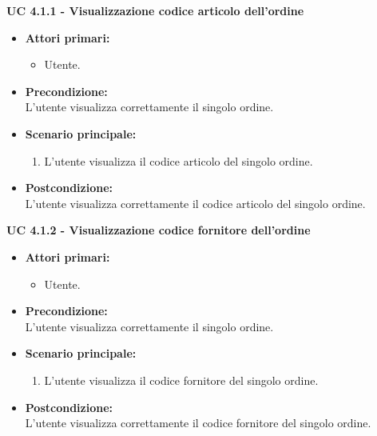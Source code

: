 \vspace{0.4cm}

\noindent \textbf{\large UC 4.1.1 - Visualizzazione codice articolo dell'ordine}
\label{uc:visualizzazione-codice-articolo}
\begin{itemize}

	\item \textbf{Attori primari: }
		\begin{itemize}
			\item Utente.
		\end{itemize}

	\item \textbf{Precondizione: }\\[0.3cm]
		L'utente visualizza correttamente il singolo ordine.

	\item \textbf{Scenario principale: }
		\begin{enumerate}
			\item L'utente visualizza il codice articolo del singolo ordine.
		\end{enumerate}
		

	\item \textbf{Postcondizione: }\\[0.3cm]
		L'utente visualizza correttamente il codice articolo del singolo ordine.

\end{itemize}

\vspace{0.4cm}

\noindent \textbf{\large UC 4.1.2 - Visualizzazione codice fornitore dell'ordine}
\label{uc:visualizzazione-codice-fornitore}
\begin{itemize}

	\item \textbf{Attori primari: }
		\begin{itemize}
			\item Utente.
		\end{itemize}

	\item \textbf{Precondizione: }\\[0.3cm]
		L'utente visualizza correttamente il singolo ordine.

	\item \textbf{Scenario principale: }
		\begin{enumerate}
			\item L'utente visualizza il codice fornitore del singolo ordine.
		\end{enumerate}
		

	\item \textbf{Postcondizione: }\\[0.3cm]
		L'utente visualizza correttamente il codice fornitore del singolo ordine.

\end{itemize}

